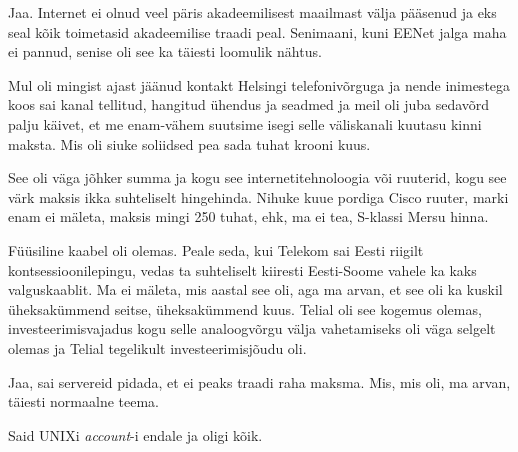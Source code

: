 
Jaa. Internet ei olnud veel päris akadeemilisest maailmast välja pääsenud ja 
eks seal kõik toimetasid akadeemilise traadi peal. Senimaani, kuni EENet jalga 
maha ei pannud, senise oli see ka täiesti  loomulik nähtus. 


Mul oli mingist ajast jäänud kontakt Helsingi telefonivõrguga ja nende 
inimestega koos sai  kanal tellitud, hangitud ühendus ja seadmed ja meil oli 
juba  sedavõrd palju käivet, et me enam-vähem suutsime isegi selle väliskanali 
kuutasu kinni maksta. Mis oli siuke soliidsed pea sada tuhat krooni kuus. 


See oli väga jõhker summa ja kogu see internetitehnoloogia või 
ruuterid,  kogu see värk maksis ikka suhteliselt hingehinda. Nihuke kuue 
pordiga Cisco ruuter, marki enam ei mäleta,  maksis mingi 250 tuhat, ehk, ma ei 
tea, S-klassi Mersu hinna.


Füüsiline kaabel oli olemas. Peale seda, kui Telekom sai 
Eesti riigilt kontsessioonilepingu,  vedas ta suhteliselt kiiresti Eesti-Soome 
vahele ka kaks valguskaablit. Ma ei mäleta, mis aastal see oli, aga ma arvan, 
et see oli ka kuskil üheksakümmend seitse, üheksakümmend kuus. 
Telial oli see kogemus olemas, investeerimisvajadus kogu selle 
analoogvõrgu välja vahetamiseks oli väga selgelt olemas ja Telial tegelikult 
investeerimisjõudu oli. 


Jaa, sai servereid pidada, et ei peaks traadi raha maksma. Mis, mis oli, ma 
arvan, täiesti normaalne teema.


Said UNIXi \emph{account}-i endale ja oligi kõik.

